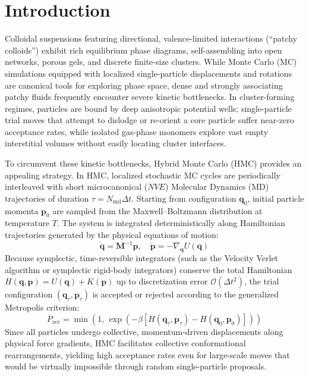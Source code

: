 \documentclass[11pt,a4paper]{article}
\begin{document}
\section{Introduction}

Colloidal suspensions featuring directional, valence-limited interactions (``patchy colloids'') exhibit rich equilibrium phase diagrams, self-assembling into open networks, porous gels, and discrete finite-size clusters\cite{sciortino2007patchy,palaia2022patchy,bianchi2006phase}. While Monte Carlo (MC) simulations equipped with localized single-particle displacements and rotations are canonical tools for exploring phase space, dense and strongly associating patchy fluids frequently encounter severe kinetic bottlenecks. In cluster-forming regimes, particles are bound by deep anisotropic potential wells; single-particle trial moves that attempt to dislodge or re-orient a core particle suffer near-zero acceptance rates, while isolated gas-phase monomers explore vast empty interstitial volumes without easily locating cluster interfaces\cite{rovigatti2018simulate,whitelam2007avoiding}.

To circumvent these kinetic bottlenecks, Hybrid Monte Carlo (HMC)\cite{duane1987hybrid,mehlig1992hybrid,forrest1990hybrid} provides an appealing strategy. In HMC, localized stochastic MC cycles are periodically interleaved with short microcanonical ($NVE$) Molecular Dynamics (MD) trajectories of duration $\tau = N_{\mathrm{md}} \Delta t$. Starting from configuration $\mathbf{q}_0$, initial particle momenta $\mathbf{p}_0$ are sampled from the Maxwell--Boltzmann distribution at temperature $T$. The system is integrated deterministically along Hamiltonian trajectories generated by the physical equations of motion:
\begin{equation}
\dot{\mathbf{q}} = \mathbf{M}^{-1}\mathbf{p}, \quad \dot{\mathbf{p}} = -\nabla_{\mathbf{q}} U(\mathbf{q})
\end{equation}
Because symplectic, time-reversible integrators (such as the Velocity Verlet algorithm or symplectic rigid-body integrators\cite{miller2002symplectic}) conserve the total Hamiltonian $H(\mathbf{q}, \mathbf{p}) = U(\mathbf{q}) + K(\mathbf{p})$ up to discretization error $\mathcal{O}(\Delta t^2)$, the trial configuration $(\mathbf{q}_\tau, \mathbf{p}_\tau)$ is accepted or rejected according to the generalized Metropolis criterion:
\begin{equation}
P_{\mathrm{acc}} = \min\left(1, \, \exp\left(-\beta [H(\mathbf{q}_\tau, \mathbf{p}_\tau) - H(\mathbf{q}_0, \mathbf{p}_0)]\right)\right)
\end{equation}
Since all particles undergo collective, momentum-driven displacements along physical force gradients, HMC facilitates collective conformational rearrangements, yielding high acceptance rates even for large-scale moves that would be virtually impossible through random single-particle proposals\cite{neal2011mcmc,forrest1990hybrid}.
\end{document}
